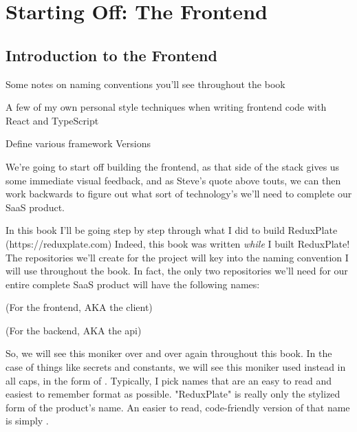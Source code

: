 \documentclass[a4paper,
                             oneside,
                             BCOR1.0cm,
                             DIV11,
                             parskip=full,
                             11pt]{scrbook}
\begin{document}
\chapter{Starting Off: The Frontend}\label{cap:primer}

\section{Introduction to the Frontend}\label{sec:titles}
\begin{arrows}
\item Some notes on naming conventions you'll see throughout the book
\item A few of my own personal style techniques when writing frontend code with React and TypeScript
\item Define various framework Versions
\end{arrows}

We're going to start off building the frontend, as that side of the stack gives us some immediate visual feedback, and as Steve's quote above touts, we can then work backwards to figure out what sort of technology's we'll need to complete our SaaS product. 


In this book I'll be going step by step through what I did to build ReduxPlate (https://reduxplate.com) Indeed, this book was written \textit{while} I built ReduxPlate! The repositories we'll create for the project will key into the naming convention I will use throughout the book. In fact, the only two repositories we'll need for our entire complete SaaS product will have the following names:

 (For the frontend, AKA the client)

 (For the backend, AKA the api)

So, we will see this  moniker over and over again throughout this book. In the case of things like secrets and constants, we will see this moniker used instead in all caps, in the form of . Typically, I pick names that are an easy to read and easiest to remember format as possible. "ReduxPlate" is really only the stylized form of the product's name. An easier to read, code-friendly version of that name is simply .
\end{document}
